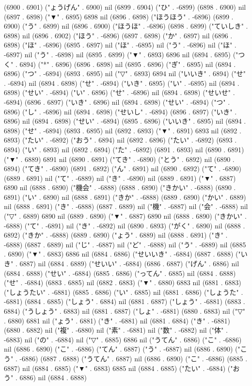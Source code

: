 (6900 . 6901) ("ょうげん" . 6900) nil (6899 . 6904) ("ひ" . -6899) (6898 . 6900) nil (6897 . 6898) ("▼" . 6895) 6898 nil (6896 . 6898) ("ほうほう" . -6896) (6899 . 6900) ("う" . 6899) nil (6896 . 6900) ("ほうほ" . -6896) (6898 . 6899) ("ていしき" . 6898) nil (6896 . 6902) ("ほう" . -6896) (6897 . 6898) ("か" . 6897) nil (6896 . 6898) ("ほ" . -6896) (6895 . 6897) nil ("ほ" . -6895) nil ("う" . -6896) nil ("ほ" . -6897) nil ("う" . -6898) nil (6895 . 6899) ("▼" . 6893) 6896 nil (6894 . 6895) ("つく" . 6894) ("*" . 6896) (6896 . 6898) nil (6895 . 6896) ("ぎ" . 6895) nil (6894 . 6896) ("つ" . -6894) (6893 . 6895) nil ("▽" . 6893) 6894 nil ("いいき" . 6894) ("せ" . -6894) nil (6894 . 6898) ("せ" . -6894) ("いき" . 6895) ("い" . -6895) nil (6894 . 6898) ("せい" . -6894) ("い" . 6896) ("せ" . -6896) nil (6894 . 6898) ("せいせ" . -6894) (6896 . 6897) ("いき" . 6896) nil (6894 . 6898) ("せい" . -6894) ("つ" . 6896) ("し" . -6896) nil (6894 . 6898) ("せいし" . -6894) (6896 . 6897) ("いき" . 6896) nil (6894 . 6898) ("せい" . -6894) (6895 . 6896) ("いいき" . 6895) nil (6894 . 6898) ("せ" . -6894) (6893 . 6895) nil (6892 . 6893) ("▼" . 6891) 6893 nil (6892 . 6893) ("たい" . -6892) ("おう" . 6894) nil (6892 . 6896) ("たい" . -6892) (6893 . 6894) ("い" . 6893) nil (6892 . 6894) ("た" . -6892) (6891 . 6893) nil (6890 . 6891) ("▼" . 6889) 6891 nil (6890 . 6891) ("てき" . -6890) ("とう" . 6892) nil (6890 . 6894) ("てき" . -6890) (6891 . 6892) ("ん" . 6891) nil (6890 . 6892) ("て" . -6890) (6889 . 6891) nil ("て" . -6889) nil ("き" . -6890) nil (6889 . 6891) ("▼" . 6887) 6890 nil (6888 . 6890) ("機会" . -6888) (6888 . 6890) ("きかい" . -6888) (6890 . 6891) ("い" . 6890) nil (6888 . 6891) ("きか" . -6888) (6889 . 6890) ("かい" . 6889) nil (6888 . 6891) ("き" . -6888) (6887 . 6889) nil ("機" . -6887) nil ("会" . -6888) nil ("▽" . 6889) 6890 nil (6889 . 6890) ("▼" . 6887) 6890 nil (6888 . 6890) ("きかい" . -6888) ("て" . -6891) nil ("き" . -6892) nil (6890 . 6893) ("がく" . 6890) nil (6888 . 6892) ("きか" . -6888) (6889 . 6890) ("ょう" . 6889) nil (6888 . 6891) ("き" . -6888) (6887 . 6889) nil ("じ" . -6887) nil ("ど" . -6888) nil ("う" . -6889) nil (6885 . 6890) ("▼" . 6883) 6886 nil (6884 . 6886) ("せいいき" . -6884) (6887 . 6888) ("いき" . 6887) nil (6884 . 6889) ("せいい" . -6884) (6886 . 6887) ("げん" . 6886) nil (6884 . 6888) ("せい" . -6884) (6885 . 6886) ("ってん" . 6885) nil (6884 . 6888) ("せ" . -6884) (6883 . 6885) nil (6882 . 6883) ("▼" . 6880) 6883 nil (6881 . 6883) ("しょうたい" . -6881) (6885 . 6886) ("い" . 6885) nil (6881 . 6886) ("しょうた" . -6881) (6884 . 6885) ("しょう" . 6884) nil (6881 . 6887) ("しょう" . -6881) (6883 . 6884) ("うしょう" . 6883) nil (6881 . 6887) ("しょ" . -6881) (6880 . 6883) nil ("▽" . 6880) 6881 nil ("ょう" . 6881) ("き" . -6881) nil (6881 . 6884) ("き" . -6881) (6880 . 6882) nil ("複" . -6880) nil ("素" . -6881) nil ("数" . -6882) nil ("体" . -6883) nil ("の" . -6884) nil ("▽" . 6885) 6886 nil ("うてん" . 6886) ("こ" . -6886) nil (6886 . 6890) ("こ" . -6886) ("てん" . 6887) ("う" . -6887) nil (6886 . 6890) ("こう" . -6886) (6887 . 6888) ("うてん" . 6887) nil (6886 . 6890) ("こ" . -6886) (6885 . 6887) nil (6884 . 6885) ("▼" . 6883) 6885 nil (6884 . 6885) ("たい" . -6884) ("おう" . 6886) nil (6884 . 6888) 